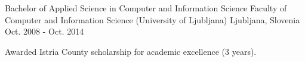 

\begin{cventries}

  \cventry
    {Bachelor of Applied Science in Computer and Information Science} %
    {Faculty of Computer and Information Science (University of Ljubljana)} %
    {Ljubljana, Slovenia} %
    {Oct. 2008 - Oct. 2014} %
    {
      \begin{cvitems} %
        \item {Awarded Istria County scholarship for academic excellence (3 years).}
      	\end{cvitems}
    }

\end{cventries}
